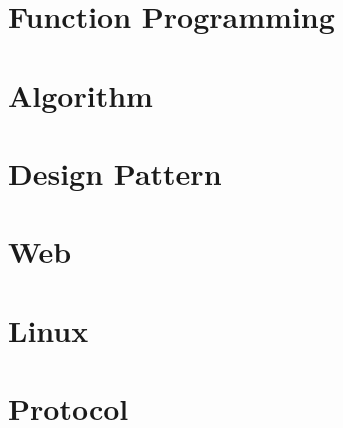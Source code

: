 \documentclass[12pt, oneside, b5paper]{book}
\begin{document}
\part{Function Programming}



\part{Algorithm}


\part{Design Pattern}


\part{Web}



\part{Linux}






\part{Protocol}


		
\newpage
\end{document}
